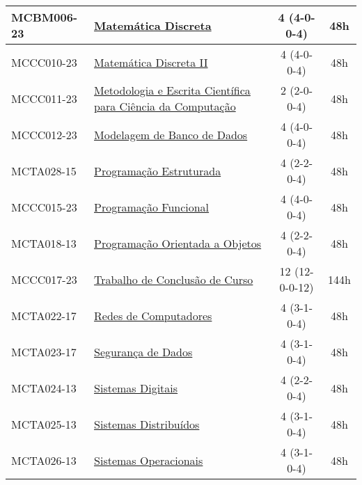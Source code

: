 \begin{table}[h!]
\begin{tabular}{|l|p{}|c|c|}
        \hline
        MCBM006-23 & \hyperref[disc:mdI]{Matemática Discreta} & 4 (4-0-0-4) & 48h \\
        \hline
        MCCC010-23 & \hyperref[disc:mdII]{Matemática Discreta II} & 4 (4-0-0-4) & 48h \\
        \hline
        MCCC011-23 & \hyperref[disc:metod]{Metodologia e Escrita Científica para Ciência da Computação} & 2 (2-0-0-4) & 48h \\
        \hline
        MCCC012-23 & \hyperref[disc:mbd]{Modelagem de Banco de Dados} & 4 (4-0-0-4) & 48h \\
        \hline
        \hline
        MCTA028-15& \hyperref[disc:pe]{Programação Estruturada} & 4 (2-2-0-4) & 48h \\
        \hline
        MCCC015-23 & \hyperref[disc:pf]{Programação Funcional} & 4 (4-0-0-4) & 48h \\
        \hline
        MCTA018-13 & \hyperref[disc:poo]{Programação Orientada a Objetos} & 4 (2-2-0-4) & 48h \\
        \hline
        MCCC017-23 & \hyperref[disc:tccIII]{Trabalho de Conclusão de Curso} & 12 (12-0-0-12) & 144h \\
        \hline
        MCTA022-17 & \hyperref[disc:redes]{Redes de Computadores} & 4 (3-1-0-4) & 48h \\
        \hline
        MCTA023-17 & \hyperref[disc:seg]{Segurança de Dados} & 4 (3-1-0-4) & 48h \\
        \hline
        MCTA024-13 & \hyperref[disc:sist_dig]{Sistemas Digitais} & 4 (2-2-0-4) & 48h \\
        \hline
        MCTA025-13 & \hyperref[disc:sist_distr]{Sistemas Distribuídos} & 4 (3-1-0-4) & 48h \\
        \hline
        MCTA026-13 & \hyperref[disc:so]{Sistemas Operacionais} & 4 (3-1-0-4) & 48h\\
        \hline
    \end{tabular}
\end{table}

